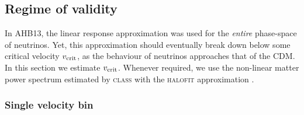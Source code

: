 \documentclass[useAMS, usenatbib]{mnras}
\newcommand{\beq}{\begin{equation}}
\newcommand{\eeq}{\end{equation}}
\newcommand{\bs}{\boldsymbol}
\begin{document}

\subsection{Regime of validity} \label{sec:validity}

In AHB13, the linear response approximation was used for the \emph{entire} phase-space of neutrinos. Yet, this approximation should eventually break down below some critical velocity $v_{\rm crit}$, as the behaviour of neutrinos approaches that of the CDM. In this section we estimate $v_{\rm crit}$. Whenever required, we use the non-linear matter power spectrum estimated by \textsc{class} \citep{Lesgourgues_11, Blas_11} with the \textsc{halofit} approximation \citep{Smith_2003}.


\subsubsection{Single velocity bin} \label{sec:single-bin}
\end{document}
